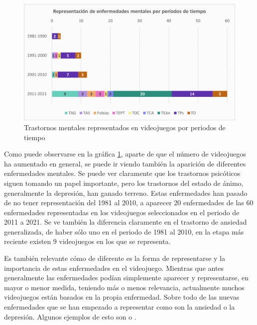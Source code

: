\documentclass[12pt, a4paper,twoside,titlepage]{book}
\begin{document}
\begin{figure}
    \centering
    \includegraphics[width=1\linewidth]{Graficas estudio/G1; Enfperiodos.png}
    \caption{Trastornos mentales representados en videojuegos por periodos de tiempo}
    \label{fig:ESTEnfvidtiempo}
\end{figure}

Como puede observarse en la gráfica \ref{fig:ESTEnfvidtiempo}, aparte de que el número de videojuegos ha aumentado en general, se puede ir viendo también la aparición de diferentes enfermedades mentales. Se puede ver claramente que los trastornos psicóticos siguen tomando un papel importante, pero los trastornos del estado de ánimo, generalmente la depresión, han ganado terreno. Estas enfermedades han pasado de no tener representación del 1981 al 2010, a aparecer 20 enfermedades de las 60 enfermedades representadas en los videojuegos seleccionados en el periodo de 2011 a 2021. Se ve también la diferencia claramente en el trastorno de ansiedad generalizada, de haber sólo uno en el periodo de 1981 al 2010, en la etapa más reciente existen 9 videojuegos en los que se representa.


Es también relevante cómo de diferente es la forma de representarse y la importancia de estas enfermedades en el videojuego. Mientras que antes generalmente las enfermedades podían simplemente aparecer y representarse, en mayor o menor medida, teniendo más o menos relevancia, actualmente muchos videojuegos están basados en la propia enfermedad. Sobre todo de las nuevas enfermedades que se han empezado a representar como son la ansiedad o la depresión. Algunos ejemplos de esto son  o .  
\end{document}
